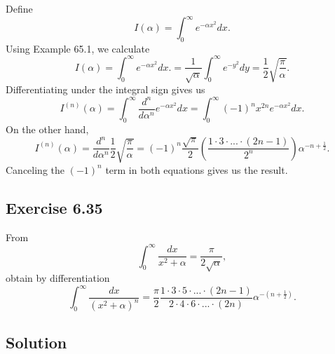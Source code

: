 Define
\begin{equation*}
    I(\alpha) = \int_0^{\infty} e^{-\alpha x^2} dx.
\end{equation*}
Using Example 65.1, we calculate
\begin{equation*}
    I(\alpha) = \int_0^{\infty} e^{-\alpha x^2} dx.
        = \frac{1}{\sqrt{\alpha}} \int_0^{\infty} e^{-y^2} dy
        = \frac{1}{2} \sqrt{\frac{\pi}{\alpha}}.
\end{equation*}
Differentiating under the integral sign gives us
\begin{equation*}
    I^{(n)}(\alpha) = \int_0^{\infty} \frac{d^n}{d\alpha^n} e^{-\alpha x^2} dx
        = \int_0^{\infty} (-1)^n x^{2n} e^{-\alpha x^2} dx.
\end{equation*}
On the other hand,
\begin{equation*}
    I^{(n)}(\alpha) = \frac{d^n}{d\alpha^n} \frac{1}{2} \sqrt{\frac{\pi}{\alpha}}
        = (-1)^n \frac{\sqrt{\pi}}{2} \left(\frac{1 \cdot 3 \cdot ... \cdot (2n - 1)}{2^n} \right) \alpha^{-n + \frac{1}{2}}.
\end{equation*}
Canceling the $(-1)^n$ term in both equations gives us the result.


\subsection*{Exercise 6.35}

From
\begin{equation*}
    \int_0^{\infty} \frac{dx}{x^2 + \alpha} = \frac{\pi}{2 \sqrt{\alpha}},
\end{equation*}
obtain by differentiation
\begin{equation*}
    \int_0^{\infty} \frac{dx}{(x^2 + \alpha)^n} = \frac{\pi}{2} \frac{1 \cdot 3 \cdot 5 \cdot ... \cdot (2n - 1)}{2 \cdot 4 \cdot 6 \cdot ... \cdot (2n)} \alpha^{-(n + \frac{1}{2})}.
\end{equation*}

\subsection*{Solution}

